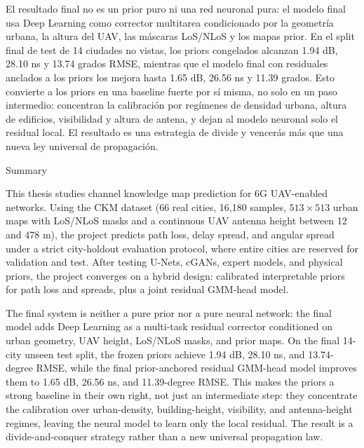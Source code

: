El resultado final no es un prior puro ni una red neuronal pura: el modelo final
usa Deep Learning como corrector multitarea condicionado por la geometría urbana,
la altura del UAV, las máscaras LoS/NLoS y los mapas prior. En el split final de
test de 14 ciudades no vistas, los priors congelados alcanzan 1.94 dB,
28.10 ns y 13.74 grados RMSE, mientras que el modelo final con residuales
anclados a los priors los mejora hasta 1.65 dB, 26.56 ns y 11.39 grados. Esto
convierte a los priors en una baseline fuerte por sí misma, no solo en un paso
intermedio: concentran la calibración por regímenes de densidad urbana, altura
de edificios, visibilidad y altura de antena, y dejan al modelo neuronal solo el
residual local. El resultado es una estrategia de divide y vencerás más que una
nueva ley universal de propagación.

\begin{center}
  \huge\bfseries\raggedright\vspace*{.5\baselineskip} Summary~\hrulefill
\end{center}
This thesis studies channel knowledge map prediction for 6G UAV-enabled
networks. Using the CKM dataset (66 real cities, 16{,}180 samples, $513\times
513$ urban maps with LoS/NLoS masks and a continuous UAV antenna height
between 12 and 478 m), the project predicts path loss, delay spread, and
angular spread under a strict city-holdout evaluation protocol, where entire
cities are reserved for validation and test. After testing U-Nets, cGANs,
expert models, and physical priors, the project converges on a hybrid design:
calibrated interpretable priors for path loss and spreads, plus a joint
residual GMM-head model.

The final system is neither a pure prior nor a pure neural network: the final
model adds Deep Learning as a multi-task residual corrector conditioned on urban
geometry, UAV height, LoS/NLoS masks, and prior maps. On the final 14-city
unseen test split, the frozen priors achieve 1.94 dB, 28.10 ns, and 13.74-degree
RMSE, while the final prior-anchored residual GMM-head model improves them to
1.65 dB, 26.56 ns, and 11.39-degree RMSE. This makes the priors a strong
baseline in their own right, not just an intermediate step: they concentrate the
calibration over urban-density, building-height, visibility, and antenna-height
regimes, leaving the neural model to learn only the local residual. The result is
a divide-and-conquer strategy rather than a new universal propagation law.
